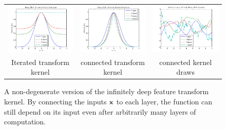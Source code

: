 \documentclass{article}
\begin{document}


\begin{figure}
\centering
\begin{tabular}{ccc}
\hspace{-0.5cm}\includegraphics[width=0.35\columnwidth, clip, trim = 0cm 0cm 0cm 0.61cm]{figures/deep_kernel} &
\hspace{-0.5cm}\includegraphics[width=0.35\columnwidth, clip, trim = 0cm 0cm 0cm 0.61cm]{figures/deep_kernel_connected} &
\hspace{-0.5cm}\includegraphics[width=0.35\columnwidth, clip, trim = 0cm 0cm 0cm 0.61cm]{figures/deep_kernel_connected_draws} \\
Iterated transform kernel & connected transform kernel & connected kernel \gp{} draws
\end{tabular}
\caption{A non-degenerate version of the infinitely deep feature transform kernel.  By connecting the inputs ${\bf{x}}$ to each layer, the function can still depend on its input even after arbitrarily many layers of computation.}
\label{fig:deep_kernel_connected}
\end{figure}
\end{document}
